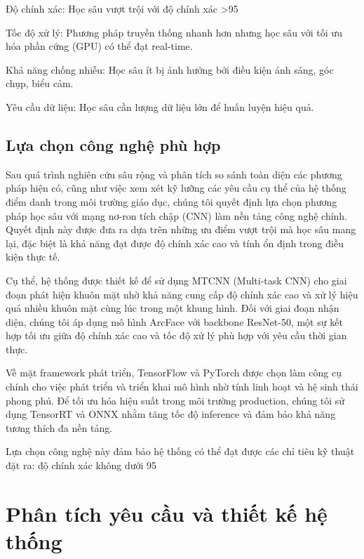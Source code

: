 \documentclass[12pt,a4paper]{report}
\begin{document}
Độ chính xác: Học sâu vượt trội với độ chính xác >95%

Tốc độ xử lý: Phương pháp truyền thống nhanh hơn nhưng học sâu với tối ưu hóa phần cứng (GPU) có thể đạt real-time.

Khả năng chống nhiễu: Học sâu ít bị ảnh hưởng bởi điều kiện ánh sáng, góc chụp, biểu cảm.

Yêu cầu dữ liệu: Học sâu cần lượng dữ liệu lớn để huấn luyện hiệu quả.

\section{Lựa chọn công nghệ phù hợp}
Sau quá trình nghiên cứu sâu rộng và phân tích so sánh toàn diện các phương pháp hiện có, cũng như việc xem xét kỹ lưỡng các yêu cầu cụ thể của hệ thống điểm danh trong môi trường giáo dục, chúng tôi quyết định lựa chọn phương pháp học sâu với mạng nơ-ron tích chập (CNN) làm nền tảng công nghệ chính. Quyết định này được đưa ra dựa trên những ưu điểm vượt trội mà học sâu mang lại, đặc biệt là khả năng đạt được độ chính xác cao và tính ổn định trong điều kiện thực tế.

Cụ thể, hệ thống được thiết kế để sử dụng MTCNN (Multi-task CNN) cho giai đoạn phát hiện khuôn mặt nhờ khả năng cung cấp độ chính xác cao và xử lý hiệu quả nhiều khuôn mặt cùng lúc trong một khung hình. Đối với giai đoạn nhận diện, chúng tôi áp dụng mô hình ArcFace với backbone ResNet-50, một sự kết hợp tối ưu giữa độ chính xác cao và tốc độ xử lý phù hợp với yêu cầu thời gian thực.

Về mặt framework phát triển, TensorFlow và PyTorch được chọn làm công cụ chính cho việc phát triển và triển khai mô hình nhờ tính linh hoạt và hệ sinh thái phong phú. Để tối ưu hóa hiệu suất trong môi trường production, chúng tôi sử dụng TensorRT và ONNX nhằm tăng tốc độ inference và đảm bảo khả năng tương thích đa nền tảng.

Lựa chọn công nghệ này đảm bảo hệ thống có thể đạt được các chỉ tiêu kỹ thuật đặt ra: độ chính xác không dưới 95%

\chapter{Phân tích yêu cầu và thiết kế hệ thống}
\end{document}
